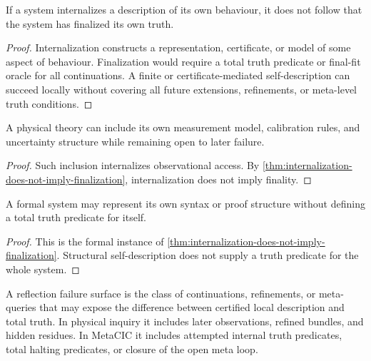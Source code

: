 \begin{theorem}
\label{thm:internalization-does-not-imply-finalization}
If a system internalizes a description of its own behaviour, it does not follow that the system has finalized its own truth.
\end{theorem}

\begin{proof}
Internalization constructs a representation, certificate, or model of some aspect of behaviour. Finalization would require a total truth predicate or final-fit oracle for all continuations. A finite or certificate-mediated self-description can succeed locally without covering all future extensions, refinements, or meta-level truth conditions.
\end{proof}

\begin{corollary}
\label{cor:observation-protocols-not-final}
A physical theory can include its own measurement model, calibration rules, and uncertainty structure while remaining open to later failure.
\end{corollary}

\begin{proof}
Such inclusion internalizes observational access. By \autoref{thm:internalization-does-not-imply-finalization}, internalization does not imply finality.
\end{proof}

\begin{corollary}
\label{cor:syntax-internalization-not-truth}
A formal system may represent its own syntax or proof structure without defining a total truth predicate for itself.
\end{corollary}

\begin{proof}
This is the formal instance of \autoref{thm:internalization-does-not-imply-finalization}. Structural self-description does not supply a truth predicate for the whole system.
\end{proof}

\begin{definition}
\label{def:reflection-failure-surface}
A reflection failure surface is the class of continuations, refinements, or meta-queries that may expose the difference between certified local description and total truth. In physical inquiry it includes later observations, refined bundles, and hidden residues. In MetaCIC it includes attempted internal truth predicates, total halting predicates, or closure of the open meta loop.
\end{definition}

